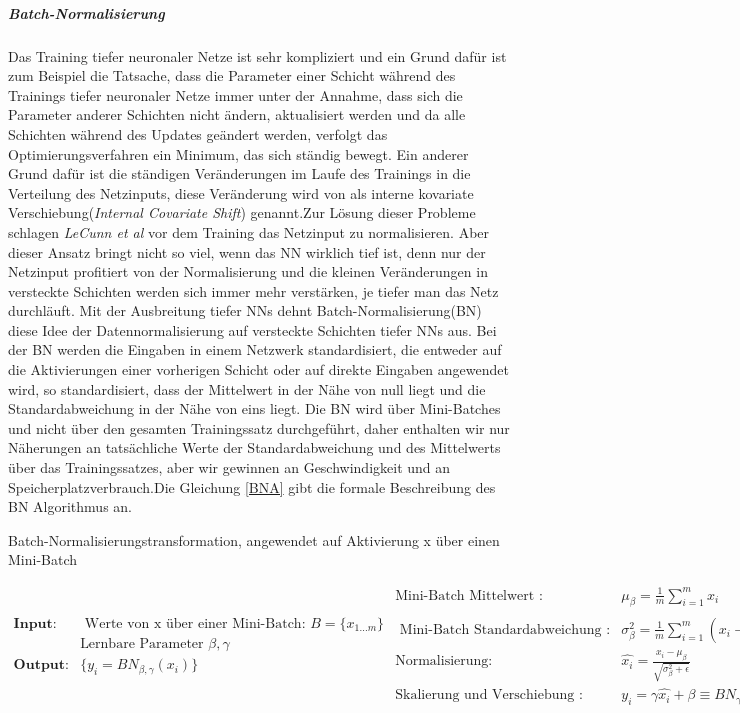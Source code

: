 \documentclass[12pt,a4paper]{scrartcl}
\numberwithin{equation}{section}
\begin{document}
\subparagraph{Batch-Normalisierung}\label{Batch-Normalisierung}
Das Training tiefer neuronaler Netze ist sehr kompliziert und ein Grund dafür ist zum Beispiel die Tatsache, dass die Parameter einer Schicht während des Trainings tiefer neuronaler Netze immer unter der Annahme, dass sich die Parameter anderer Schichten nicht ändern, aktualisiert werden und da alle Schichten während des Updates geändert werden, verfolgt das Optimierungsverfahren ein Minimum, das sich ständig bewegt. Ein anderer Grund dafür ist die ständigen Veränderungen im Laufe des Trainings in die Verteilung des Netzinputs, diese Veränderung wird von \cite{bactchnormalisation} als interne kovariate Verschiebung(\textit{Internal Covariate Shift}) genannt.Zur Lösung dieser Probleme schlagen \textit{LeCunn et al}\cite{LeCun} vor dem Training das Netzinput zu normalisieren. Aber dieser Ansatz bringt nicht so viel, wenn das \ac{NN} wirklich tief ist, denn nur der Netzinput profitiert von der Normalisierung und die kleinen Veränderungen in versteckte Schichten werden sich immer mehr verstärken, je tiefer man das Netz durchläuft. Mit der Ausbreitung tiefer \acsp{NN} dehnt Batch-Normalisierung(BN)\cite{bactchnormalisation} diese Idee der Datennormalisierung auf versteckte Schichten tiefer \acsp{NN} aus. Bei der BN werden die Eingaben in einem Netzwerk standardisiert, die entweder auf die Aktivierungen einer vorherigen Schicht oder auf direkte Eingaben angewendet wird, so standardisiert, dass der Mittelwert in der Nähe von null liegt und die Standardabweichung in der Nähe von eins liegt. Die BN wird über Mini-Batches und nicht über den gesamten Trainingssatz durchgeführt, daher enthalten wir nur Näherungen an tatsächliche Werte der Standardabweichung und des Mittelwerts über das Trainingssatzes, aber wir gewinnen an Geschwindigkeit und an Speicherplatzverbrauch.Die Gleichung \eqref{BNA} gibt die formale Beschreibung des BN Algorithmus an.
\begin{center}
	Batch-Normalisierungstransformation, angewendet auf Aktivierung x über einen Mini-Batch
\end{center}
\begin{subequations}
	\begin{align*}
	\textbf{Input:} & \text{  Werte von x über einer Mini-Batch: } B=\{x_{1...m}\}\\
	& \text{Lernbare Parameter  } \beta, \gamma \\
	\textbf{Output:} & \{ y_i = BN_{\beta, \gamma}(x_i)\}
	\end{align*}
	\begin{align}
	\text{Mini-Batch Mittelwert  : } &\mu_\beta=\frac{1}{m}\sum_{i = 1}^{m}x_i \\
	\text{ Mini-Batch Standardabweichung :} &\sigma_\beta^2=\frac{1}{m}\sum_{i = 1}^{m}(x_i- \mu_\beta)^2 \\
	\text{Normalisierung:} & \widehat{x_i} = \frac{x_i - \mu_\beta}{\sqrt{\sigma_\beta^2 + \epsilon}} \\
	\text{Skalierung und Verschiebung :} & {y_i} = \gamma\widehat{x_i} + \beta \equiv BN_{\gamma, \beta}
	\end{align}
	\label{BNA}
\end{subequations}
\end{document}
